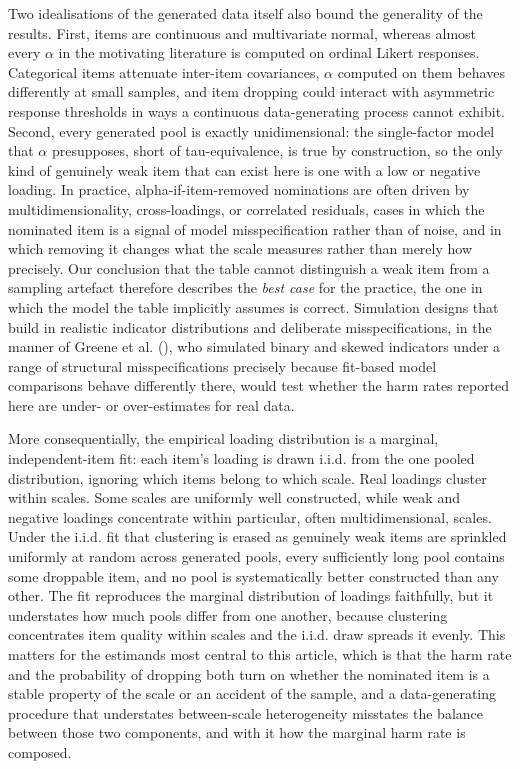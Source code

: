 \documentclass[
  nonatbib,
  authoryear,
  preprint]{elsarticle}
\begin{document}
Two idealisations of the generated data itself also bound the generality
of the results. First, items are continuous and multivariate normal,
whereas almost every \(\alpha\) in the motivating literature is computed
on ordinal Likert responses. Categorical items attenuate inter-item
covariances, \(\alpha\) computed on them behaves differently at small
samples, and item dropping could interact with asymmetric response
thresholds in ways a continuous data-generating process cannot exhibit.
Second, every generated pool is exactly unidimensional: the
single-factor model that \(\alpha\) presupposes, short of
tau-equivalence, is true by construction, so the only kind of genuinely
weak item that can exist here is one with a low or negative loading. In
practice, alpha-if-item-removed nominations are often driven by
multidimensionality, cross-loadings, or correlated residuals, cases in
which the nominated item is a signal of model misspecification rather
than of noise, and in which removing it changes what the scale measures
rather than merely how precisely. Our conclusion that the table cannot
distinguish a weak item from a sampling artefact therefore describes the
\emph{best case} for the practice, the one in which the model the table
implicitly assumes is correct. Simulation designs that build in
realistic indicator distributions and deliberate misspecifications, in
the manner of Greene et al. (), who
simulated binary and skewed indicators under a range of structural
misspecifications precisely because fit-based model comparisons behave
differently there, would test whether the harm rates reported here are
under- or over-estimates for real data.

More consequentially, the empirical loading distribution is a marginal,
independent-item fit: each item's loading is drawn i.i.d. from the one
pooled distribution, ignoring which items belong to which scale. Real
loadings cluster within scales. Some scales are uniformly well
constructed, while weak and negative loadings concentrate within
particular, often multidimensional, scales. Under the i.i.d. fit that
clustering is erased as genuinely weak items are sprinkled uniformly at
random across generated pools, every sufficiently long pool contains
some droppable item, and no pool is systematically better constructed
than any other. The fit reproduces the marginal distribution of loadings
faithfully, but it understates how much pools differ from one another,
because clustering concentrates item quality within scales and the
i.i.d. draw spreads it evenly. This matters for the estimands most
central to this article, which is that the harm rate and the probability
of dropping both turn on whether the nominated item is a stable property
of the scale or an accident of the sample, and a data-generating
procedure that understates between-scale heterogeneity misstates the
balance between those two components, and with it how the marginal harm
rate is composed.
\end{document}

